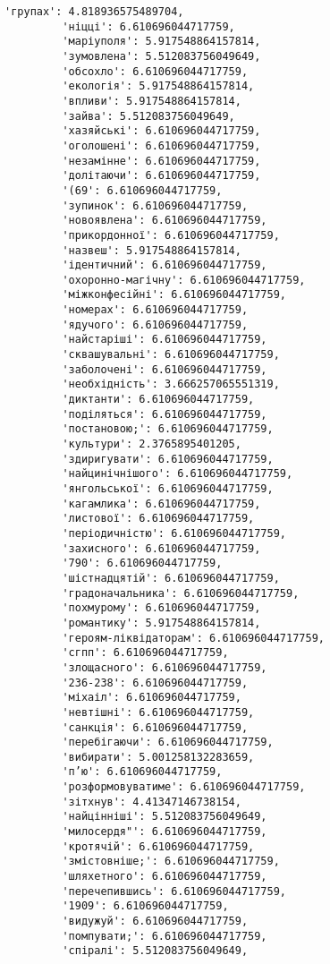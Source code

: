 \documentclass[11pt]{article}
\begin{document}
\begin{Verbatim}[commandchars=\\\{\}]
         'групах': 4.818936575489704,
         'ніцці': 6.610696044717759,
         'маріуполя': 5.917548864157814,
         'зумовлена': 5.512083756049649,
         'обсохло': 6.610696044717759,
         'екологія': 5.917548864157814,
         'впливи': 5.917548864157814,
         'зайва': 5.512083756049649,
         'хазяйські': 6.610696044717759,
         'оголошені': 6.610696044717759,
         'незамінне': 6.610696044717759,
         'долітаючи': 6.610696044717759,
         '(69': 6.610696044717759,
         'зупинок': 6.610696044717759,
         'новоявлена': 6.610696044717759,
         'прикордонної': 6.610696044717759,
         'назвеш': 5.917548864157814,
         'ідентичний': 6.610696044717759,
         'охоронно-магічну': 6.610696044717759,
         'міжконфесійні': 6.610696044717759,
         'номерах': 6.610696044717759,
         'ядучого': 6.610696044717759,
         'найстаріші': 6.610696044717759,
         'сквашувальні': 6.610696044717759,
         'заболочені': 6.610696044717759,
         'необхідність': 3.666257065551319,
         'диктанти': 6.610696044717759,
         'поділяться': 6.610696044717759,
         'постановою;': 6.610696044717759,
         'культури': 2.3765895401205,
         'здиригувати': 6.610696044717759,
         'найцинічнішого': 6.610696044717759,
         'янгольської': 6.610696044717759,
         'кагамлика': 6.610696044717759,
         'листової': 6.610696044717759,
         'періодичністю': 6.610696044717759,
         'захисного': 6.610696044717759,
         '790': 6.610696044717759,
         'шістнадцятій': 6.610696044717759,
         'градоначальника': 6.610696044717759,
         'похмурому': 6.610696044717759,
         'романтику': 5.917548864157814,
         'героям-ліквідаторам': 6.610696044717759,
         'сгпп': 6.610696044717759,
         'злощасного': 6.610696044717759,
         '236-238': 6.610696044717759,
         'міхаіл': 6.610696044717759,
         'невтішні': 6.610696044717759,
         'санкція': 6.610696044717759,
         'перебігаючи': 6.610696044717759,
         'вибирати': 5.001258132283659,
         'п’ю': 6.610696044717759,
         'розформовуватиме': 6.610696044717759,
         'зітхнув': 4.41347146738154,
         'найцінніші': 5.512083756049649,
         'милосердя"': 6.610696044717759,
         'кротячій': 6.610696044717759,
         'змістовніше;': 6.610696044717759,
         'шляхетного': 6.610696044717759,
         'перечепившись': 6.610696044717759,
         '1909': 6.610696044717759,
         'видужуй': 6.610696044717759,
         'помпувати;': 6.610696044717759,
         'спіралі': 5.512083756049649,

\end{Verbatim}
\end{document}
